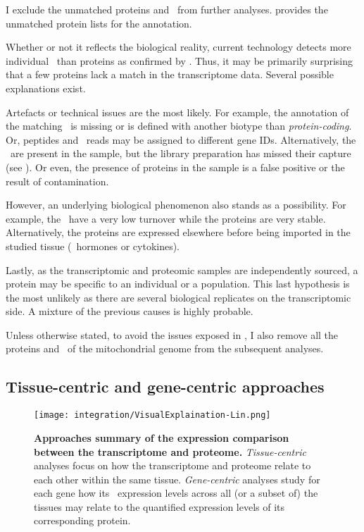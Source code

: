 I exclude the unmatched proteins and \mRNAs\ from further analyses.
 provides the unmatched protein lists
for the  annotation.\\
\vspace{-\baselineskip}

Whether or not it reflects the biological reality,
current technology detects more individual \mRNAs\ than proteins
as confirmed by .
Thus, it may be primarily surprising that
a few proteins lack a match in the transcriptome data.
Several possible explanations exist.

Artefacts or technical issues are the most likely.
For example, the annotation of the matching \RNA\ is missing
or is defined with another biotype than \emph{protein-coding}.
Or, peptides and \mRNA\ reads may be assigned to different gene IDs.
Alternatively, the \mRNAs\ are present in the sample,
but the library preparation has missed their capture
(see ).
Or even, the presence of proteins in the sample is a false positive
or the result of contamination.

However, an underlying biological phenomenon also stands as a possibility.
For example, the \mRNAs\ have a very low turnover while the proteins are very stable.
Alternatively, the proteins are expressed elsewhere before being imported in the studied tissue
(\eg\ hormones or cytokines).

Lastly, as the transcriptomic and proteomic samples are independently sourced,
a protein may be specific to an individual or a population.
This last hypothesis is the most unlikely
as there are several biological replicates on the transcriptomic side.
A mixture of the previous causes is highly probable.

Unless otherwise stated, to avoid the issues exposed in ,
I also remove all the proteins and \mRNAs\ of the mitochondrial genome
from the subsequent analyses.

\vspace{-3mm}

\subsection{Tissue-centric and gene-centric approaches}
\vspace{-3mm}
\begin{figure}[!htb]
    \texttt{[image: integration/VisualExplaination-Lin.png]}\centering
    \vspace{-3mm}
    \caption[Summary of the expression comparison approaches between
    the transcriptome and proteome]{\label{fig:visualexp}\textbf{Approaches
    summary of the expression comparison between the transcriptome and proteome.}
    \emph{Tissue-centric} analyses focus on
    how the transcriptome and proteome relate to each other within the same tissue.
    \emph{Gene-centric} analyses study for each gene how its \mRNA\ expression
    levels across all (or a subset of) the tissues may relate to
    the quantified expression levels of its corresponding protein.
    }
\end{figure}

